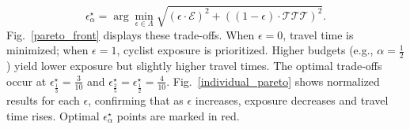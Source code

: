 \documentclass[letterpaper, 10 pt, conference]{ieeeconf}  %
\begin{document}
\begin{equation}
\label{opt_trade_off}
    \epsilon^{\star}_{\alpha} = \arg\min_{\epsilon \in \Lambda} \sqrt{ \left( \epsilon \cdot \mathcal{E} \right)^2 + \left( (1 - \epsilon) \cdot \mathcal{TTT} \right)^2 }.
\end{equation}
Fig.~\ref{pareto_front} displays these trade-offs. When $\epsilon = 0$, travel time is minimized; when $\epsilon = 1$, cyclist exposure is prioritized. Higher budgets (e.g., $\alpha = \frac{1}{2}$) yield lower exposure but slightly higher travel times. The optimal trade-offs occur at $\epsilon^{\star}_{\frac{1}{3}} =  \frac{3}{10}$ and $\epsilon^{\star}_{\frac{2}{5}} =\epsilon^{\star}_{\frac{1}{2}} = \frac{4}{10}$. Fig.~\ref{individual_pareto} shows normalized results for each $\epsilon$, confirming that as $\epsilon$ increases, exposure decreases and travel time rises. Optimal $\epsilon^{\star}_{\alpha}$ points are marked in red.
\end{document}
